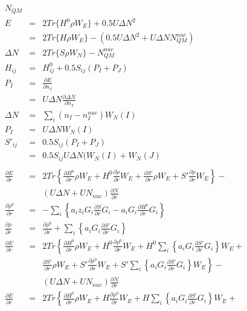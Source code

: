 \documentclass{article}
\begin{document}
\pagebreak
\begin{eqnarray*}
N_{QM} \\
E  & = &  2 Tr \{ H^0 \rho W_E \} + 0.5 U \Delta N ^2 \\
   & = & 2 Tr \{ H \rho W_E \} - (0.5 U \Delta N^2 + U \Delta N N^{nuc}_{QM} ) \\
\Delta N & = & 2 Tr \{ S \rho W_N \} - N^{nuc}_{QM}\\
H_{ij} & = & H^0_{ij} + 0.5 S_{ij} (P_I + P_J) \\
P_I  & = &  \frac{\partial E}{\partial n_I} \\
     & = & U \Delta N \frac{\partial \Delta N}{\partial n_I} \\
\Delta N  & = & \sum_i (n_I - n^{nuc}_I) W_N(I) \\
P_I  & = &  U \Delta N W_N(I) \\
S'_{ij} & = & 0.5 S_{ij} (P_I + P_J) \\
 & = & 0.5 S_{ij} U \Delta N (W_N(I) + W_N(J) \\
\\
\frac{\partial E}{\partial r} & = & 2 Tr \left\{ \frac{\partial H^0}{\partial r} \rho W_E + H^0 \frac{\partial \rho}{\partial r} W_E + \frac{\partial S'}{\partial r} \rho W_E +
  S' \frac{\partial \rho}{\partial r} W_E \right\} - \\
  & & (U \Delta N + U N_{nuc}) \frac{\partial N}{\partial r}  \\
\frac{\partial \rho^0}{\partial r} & = & - \sum_i \left\{ a_i z_i G_i \frac{\partial S}{\partial r} G_i - a_i G_i \frac{\partial H^0}{\partial r} G_i \right\} \\
\frac{\partial \rho}{\partial r} & = & \frac{\partial \rho^0}{\partial r} + \sum_i \left\{ a_i G_i \frac{\partial S'}{\partial r} G_i \right\} \\
\frac{\partial E}{\partial r} & = &
  2 Tr \left\{ \frac{\partial H^0}{\partial r} \rho W_E + H^0 \frac{\partial \rho^0}{\partial r} W_E + H^0 \sum_i \left\{ a_i G_i \frac{\partial S'}{\partial r} G_i \right\} W_E + \right. \\
    && \left. \frac{\partial S'}{\partial r} \rho W_E + S' \frac{\partial \rho^0}{\partial r} W_E + S' \sum_i \left\{ a_i G_i \frac{\partial S'}{\partial r} G_i \right\} W_E \right\} -\\
  & & (U \Delta N + U N_{nuc}) \frac{\partial N}{\partial r}  \\
\frac{\partial E}{\partial r} & = &
  2 Tr \left\{ \frac{\partial H^0}{\partial r} \rho W_E + H \frac{\partial \rho^0}{\partial r} W_E + H \sum_i \left\{ a_i G_i \frac{\partial S'}{\partial r} G_i \right\} W_E + 

\end{eqnarray*}
\end{document}
